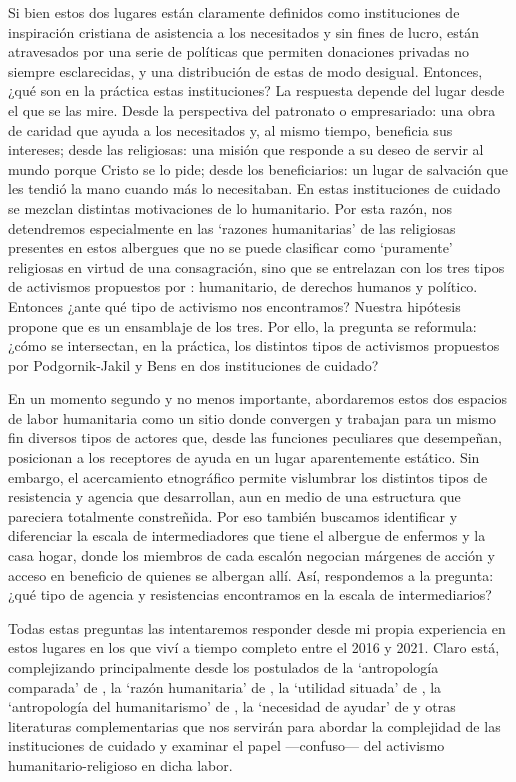 \documentclass[
  spanish,
  11pt,
  a4paper,
]{scrbook}
\begin{document}
Si bien estos dos lugares están claramente definidos como instituciones
de inspiración cristiana de asistencia a los necesitados y sin fines de
lucro, están atravesados por una serie de políticas que permiten
donaciones privadas no siempre esclarecidas, y una distribución de estas
de modo desigual. Entonces, ¿qué son en la práctica estas instituciones?
La respuesta depende del lugar desde el que se las mire. Desde la
perspectiva del patronato o empresariado: una obra de caridad que ayuda
a los necesitados y, al mismo tiempo, beneficia sus intereses; desde las
religiosas: una misión que responde a su deseo de servir al mundo porque
Cristo se lo pide; desde los beneficiarios: un lugar de salvación que
les tendió la mano cuando más lo necesitaban. En estas instituciones de
cuidado se mezclan distintas motivaciones de lo humanitario. Por esta
razón, nos detendremos especialmente en las `razones humanitarias' de
las religiosas presentes en estos albergues que no se puede clasificar
como `puramente' religiosas en virtud de una consagración, sino que se
entrelazan con los tres tipos de activismos propuestos por
\textcite{PodgornikJakil2021}: humanitario, de derechos humanos y
político. Entonces ¿ante qué tipo de activismo nos encontramos? Nuestra
hipótesis propone que es un ensamblaje de los tres. Por ello, la
pregunta se reformula: ¿cómo se intersectan, en la práctica, los
distintos tipos de activismos propuestos por Podgornik-Jakil y Bens en
dos instituciones de cuidado?

En un momento segundo y no menos importante, abordaremos estos dos
espacios de labor humanitaria como un sitio donde convergen y trabajan
para un mismo fin diversos tipos de actores que, desde las funciones
peculiares que desempeñan, posicionan a los receptores de ayuda en un
lugar aparentemente estático. Sin embargo, el acercamiento etnográfico
permite vislumbrar los distintos tipos de resistencia y agencia que
desarrollan, aun en medio de una estructura que pareciera totalmente
constreñida. Por eso también buscamos identificar y diferenciar la
escala de intermediadores que tiene el albergue de enfermos y la casa
hogar, donde los miembros de cada escalón negocian márgenes de acción y
acceso en beneficio de quienes se albergan allí. Así, respondemos a la
pregunta: ¿qué tipo de agencia y resistencias encontramos en la escala
de intermediarios?

Todas estas preguntas las intentaremos responder desde mi propia
experiencia en estos lugares en los que viví a tiempo completo entre el
2016 y 2021. Claro está, complejizando principalmente desde los
postulados de la `antropología comparada' de
\textcite{PodgornikJakil2021}, la `razón humanitaria' de
\textcite{Fassin2016}, la `utilidad situada' de
\textcite{Yotebieng2020}, la `antropología del humanitarismo' de
\textcite{Redfield2011} , la `necesidad de ayudar' de
\textcite{Malkki2015} y otras literaturas complementarias que nos
servirán para abordar la complejidad de las instituciones de cuidado y
examinar el papel ---confuso--- del activismo humanitario-religioso en
dicha labor.
\end{document}
